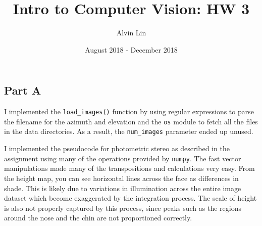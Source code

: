 \documentclass{math}
\title{Intro to Computer Vision: HW 3}
\author{Alvin Lin}
\date{August 2018 - December 2018}
\begin{document}
\maketitle
\captionsetup{justification=centering}

\subsection*{Part A}
I implemented the \texttt{load\_images()} function by using regular expressions
to parse the filename for the azimuth and elevation and the \texttt{os} module
to fetch all the files in the data directories. As a result, the
\texttt{num\_images} parameter ended up unused. \par
I implemented the pseudocode for photometric stereo as described in the
assignment using many of the operations provided by \texttt{numpy}. The fast
vector manipulations made many of the transpositions and calculations
very easy. From the height map, you can see horizontal lines across the face as
differences in shade. This is likely due to variations in illumination across
the entire image dataset which become exaggerated by the integration process.
The scale of height is also not properly captured by this process, since peaks
such as the regions around the nose and the chin are not proportioned correctly.
\end{document}
